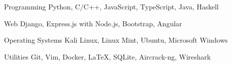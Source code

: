 


\begin{cvskills}


  \cvskill
  {Programming}
  {Python, C/C++, JavaScript, TypeScript, Java, Haskell}


  \cvskill
  {Web}
  {Django, Express.js with Node.js, Bootstrap, Angular}


  \cvskill
  {Operating Systems}
  {Kali Linux, Linux Mint, Ubuntu, Microsoft Windows}

  \cvskill
  {Utilities}
  {Git, Vim, Docker, \LaTeX, SQLite, Aircrack-ng, Wireshark}


\end{cvskills}

